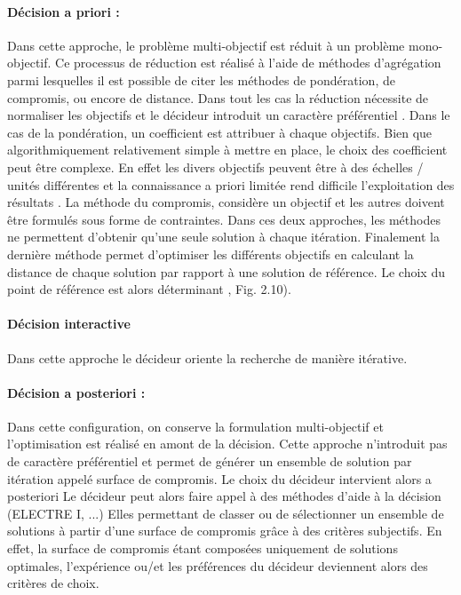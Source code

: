 \paragraph{Décision a priori :} %
\label{par:decision_a_priori}
Dans cette approche, le problème multi-objectif est réduit à un problème mono-objectif.
Ce processus de réduction est réalisé à l’aide de méthodes d’agrégation parmi lesquelles
il est possible de citer les méthodes de pondération, de compromis,
ou encore de distance. Dans tout les cas la réduction nécessite de normaliser les
objectifs et le décideur introduit un caractère préférentiel \parencite{Rivallain2013,Armand-Decker2015}.
Dans le cas de la pondération, un coefficient est attribuer à chaque objectifs. Bien que
algorithmiquement relativement simple à mettre en place, le choix des coefficient peut être complexe.
En effet les divers objectifs peuvent être à des échelles / unités différentes
et la connaissance a priori limitée rend difficile l’exploitation des résultats .
La méthode du compromis, considère un objectif et les autres doivent être formulés
sous forme de contraintes.
Dans ces deux approches, les méthodes ne permettent d’obtenir qu’une seule
solution à chaque itération.
Finalement la dernière méthode permet d’optimiser les différents objectifs en calculant
la distance de chaque solution par rapport à une solution de référence. Le choix
du point de référence est alors déterminant \parencite{Collette2002}, Fig. 2.10).



\paragraph{Décision interactive} %
\label{par:decision_interactive}
Dans cette approche le décideur oriente la recherche de manière itérative.

\paragraph{Décision a posteriori :} %
\label{par:decision_a_posteriori}
Dans cette configuration, on conserve la formulation multi-objectif et l’optimisation
est réalisé en amont de la décision. Cette approche n’introduit pas de
caractère préférentiel et permet de générer un ensemble de solution par itération
appelé surface de compromis.
Le choix du décideur intervient alors a posteriori
Le décideur peut alors faire appel à des méthodes d’aide à la décision (ELECTRE I, ...)
Elles permettant de classer ou de sélectionner un ensemble de solutions
à partir d’une surface de compromis grâce à des critères subjectifs. En effet, la
surface de compromis étant composées uniquement de solutions optimales, l’expérience ou/et
les préférences du décideur deviennent alors des critères de choix.

